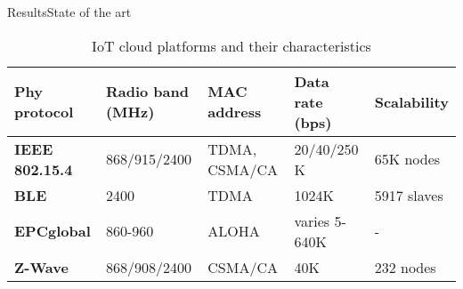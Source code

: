 \begin{frame}{Results}{State of the art}
\changefontsizes{7pt}
\begin{table}[h!]
\begin{center}
	\begin{tabulary}{\textwidth}{L|L|L|L|L}
	\bf{Phy protocol}  & \bf{Radio band (MHz)} & \bf{MAC address} & \bf{Data rate (bps)} & \bf{Scalability} \\\hline
	\bf{IEEE 802.15.4} & 868/915/2400          & TDMA, CSMA/CA    & 20/40/250 K          & 65K nodes  \\\hline
	\bf{BLE}           & 2400                  & TDMA             & 1024K                & 5917 slaves\\\hline
	\bf{EPCglobal}     & 860-960               & ALOHA            & varies 5-640K        & -          \\\hline
	\bf{Z-Wave}        & 868/908/2400          & CSMA/CA          & 40K                  & 232 nodes  \\\hline
	
	\end{tabulary}
	\caption{\label{tab:IoTPlatforms} IoT cloud platforms and their characteristics \cite{al-fuqaha_internet_24}}
\end{center}
\end{table}

\end{frame}

